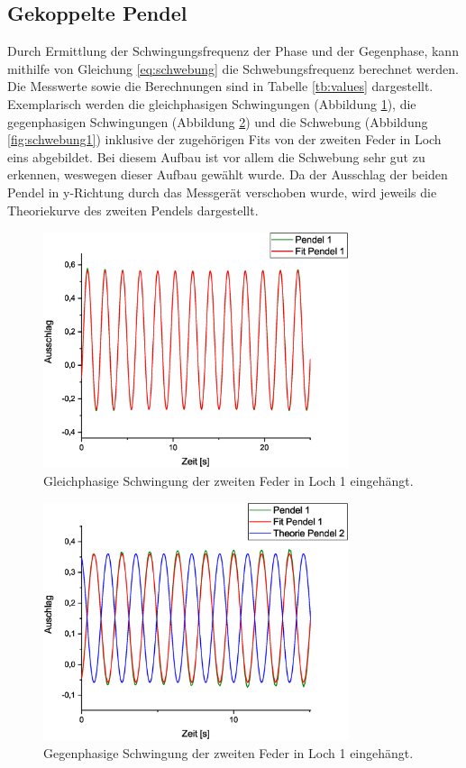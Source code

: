 \subsection{Gekoppelte Pendel}
Durch Ermittlung der Schwingungsfrequenz der Phase und der Gegenphase, kann mithilfe von Gleichung \ref{eq:schwebung} die Schwebungsfrequenz berechnet werden. Die Messwerte sowie die Berechnungen sind in Tabelle \ref{tb:values} dargestellt.
Exemplarisch werden die gleichphasigen Schwingungen (Abbildung \ref{fig:gleich1}), die gegenphasigen Schwingungen (Abbildung \ref{fig:gegen1}) und die Schwebung (Abbildung \ref{fig:schwebung1}) inklusive der zugehörigen Fits von der zweiten Feder in Loch eins abgebildet. Bei diesem Aufbau ist vor allem die Schwebung sehr gut zu erkennen, weswegen dieser Aufbau gewählt wurde. Da der Ausschlag der beiden Pendel in y-Richtung durch das Messgerät verschoben wurde, wird jeweils die Theoriekurve des zweiten Pendels dargestellt.

\begin{figure}
\begin{center}
\includegraphics[width=0.8\textwidth]{Bilder/Feder2_gleich.eps}
\caption{Gleichphasige Schwingung der zweiten Feder in Loch 1 eingehängt.}
\label{fig:gleich1}
\end{center}
\end{figure}

\begin{figure}
\begin{center}
\includegraphics[width=0.8\textwidth]{Bilder/Feder2_gegen.eps}
\caption{Gegenphasige Schwingung der zweiten Feder in Loch 1 eingehängt.}
\label{fig:gegen1}
\end{center}
\end{figure}

